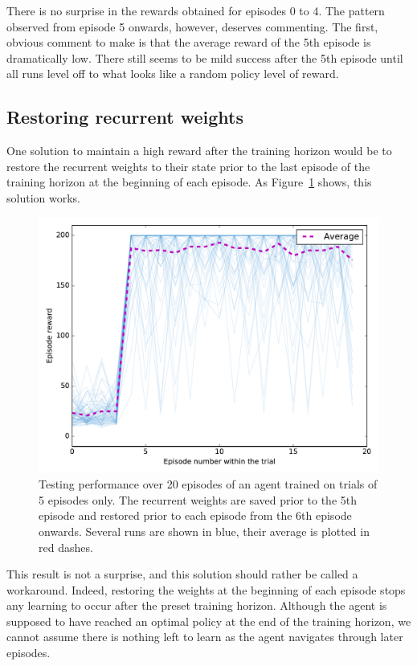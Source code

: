 There is no surprise in the rewards obtained for episodes 0 to 4. The pattern
observed from episode 5 onwards, however, deserves commenting. The first, 
obvious comment to make is that the average reward of the 5th episode is
dramatically low.  There still seems to be mild success after the 5th episode 
until all runs level off to what looks like a random policy level of 
reward.

\subsection{Restoring recurrent weights}
One solution to maintain a high reward after the training horizon would be 
to restore the recurrent weights to their state prior to the last episode of 
the training horizon at the beginning of each episode. As 
Figure~\ref{fig:horizon_5_3perms_restoring} shows, this solution works.\\

\begin{figure}
	\centering
	\includegraphics[width=0.8\linewidth]{fig/horizon_5_3perms_restoring.pdf}
	\caption{Testing performance over 20 episodes of an agent trained on 
	trials of 5 episodes only. The recurrent weights are saved prior to 
	the 5th episode and restored prior to each episode from the 6th episode
	onwards. Several runs are shown in blue, their average is plotted in
	red dashes.}
	\label{fig:horizon_5_3perms_restoring}
\end{figure}

This result is not a surprise, and this solution should rather be called a 
workaround. Indeed, restoring the weights at the beginning of each episode
stops any learning to occur after the preset training horizon. Although the
agent is supposed to have reached an optimal policy at the end of the training
horizon, we cannot assume there is nothing left to learn as the agent navigates
through later episodes.\\

